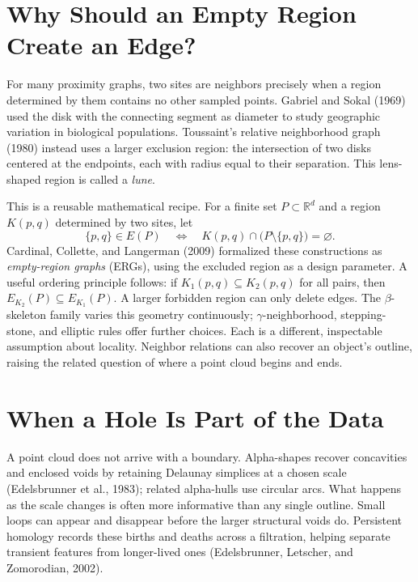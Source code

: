 \documentclass[10pt,letterpaper]{article}
\begin{document}
\section*{Why Should an Empty Region Create an Edge?}

For many proximity graphs, two sites are neighbors precisely when a region determined by them contains no other sampled points. Gabriel and Sokal (1969) used the disk with the connecting segment as diameter to study geographic variation in biological populations. Toussaint's relative neighborhood graph (1980) instead uses a larger exclusion region: the intersection of two disks centered at the endpoints, each with radius equal to their separation. This lens-shaped region is called a \emph{lune}.

This is a reusable mathematical recipe. For a finite set $P\subset\mathbb R^d$ and a region $K(p,q)$ determined by two sites, let
\begin{equation}
\{p,q\}\in E(P)\quad\Longleftrightarrow\quad
K(p,q)\cap\bigl(P\setminus\{p,q\}\bigr)=\varnothing.
\label{eq:empty}
\end{equation}
Cardinal, Collette, and Langerman (2009) formalized these constructions as \emph{empty-region graphs} (ERGs), using the excluded region as a design parameter. A useful ordering principle follows: if $K_1(p,q)\subseteq K_2(p,q)$ for all pairs, then $E_{K_2}(P)\subseteq E_{K_1}(P)$. A larger forbidden region can only delete edges. The $\beta$-skeleton family varies this geometry continuously; $\gamma$-neighborhood, stepping-stone, and elliptic rules offer further choices. Each is a different, inspectable assumption about locality. Neighbor relations can also recover an object's outline, raising the related question of where a point cloud begins and ends.

\section*{When a Hole Is Part of the Data}

A point cloud does not arrive with a boundary. Alpha-shapes recover concavities and enclosed voids by retaining Delaunay simplices at a chosen scale (Edelsbrunner et al., 1983); related alpha-hulls use circular arcs. What happens as the scale changes is often more informative than any single outline. Small loops can appear and disappear before the larger structural voids do. Persistent homology records these births and deaths across a filtration, helping separate transient features from longer-lived ones (Edelsbrunner, Letscher, and Zomorodian, 2002).
\end{document}
